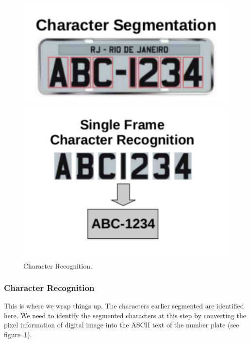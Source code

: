 \documentclass[letterpaper,12pt]{article}
\begin{document}
\begin{figure}
	\centering
	\begin{minipage}[b]{.4\textwidth}
		\centering \includegraphics[width=0.8\columnwidth]{cs.png}
		
		\caption{
			\label{fig:3} %
			Character Segmentation.
		}
		
	\end{minipage}\qquad
	\begin{minipage}[b]{.4\textwidth}
		
		\centering \includegraphics[width=0.8\columnwidth]{cr.png}
		
		\caption{
			\label{fig:4} %
			Character Recognition.
		}
		
	\end{minipage}
\end{figure}



\subsubsection{Character Recognition}
This is where we wrap things up. The characters earlier segmented are identified here. We need to identify the segmented characters at this step by converting the pixel information of digital image into the ASCII text of the number plate (see figure~\ref{fig:4}).
\end{document}
